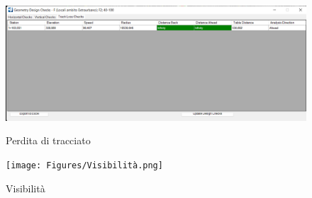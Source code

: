  \begin{figure}[H]
    \centering
    \begin{minipage}[b]{0.45\textwidth}
      \includegraphics[width=\textwidth]{Figures/Perdita di tracciato.png}
      \caption{Perdita di tracciato}
      \label{Perdita di tracciato}
    \end{minipage}
    \hfill
    \begin{minipage}[b]{0.45\textwidth}
      \texttt{[image: Figures/Visibilità.png]}
      \caption{Visibilità}
      \label{Visibilità}
    \end{minipage}
  \end{figure}